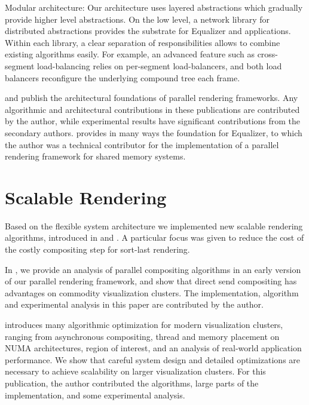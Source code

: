 \begin{compactdesc}
\item[Modular architecture:] Our architecture uses layered abstractions which
gradually provide higher level abstractions. On the low level, a network
library for distributed abstractions provides the substrate for Equalizer and
applications. Within each library, a clear separation of responsibilities
allows to combine existing algorithms easily. For example, an advanced feature
such as cross-segment load-balancing relies on per-segment load-balancers, and
both load balancers reconfigure the underlying compound tree each frame.

\end{compactdesc}

\cite{EMP:09} and \cite{ESP:18} publish the architectural foundations of
parallel rendering frameworks. Any algorithmic and architectural contributions
in these publications are contributed by the author, while experimental results
have significant contributions from the secondary authors. \cite{BRE:05}
provides in many ways the foundation for Equalizer, to which the author was a
technical contributor for the implementation of a parallel rendering framework
for shared memory systems.

\section{Scalable Rendering}

Based on the flexible system architecture we implemented new scalable rendering
algorithms, introduced in \cite{EMP:09} and \cite{ESP:18}. A particular focus
was given to reduce the cost of the costly compositing step for sort-last
rendering.

In \cite{EP:07}, we provide an analysis of parallel compositing algorithms in an
early version of our parallel rendering framework, and show that direct send
compositing has advantages on commodity visualization clusters. The
implementation, algorithm and experimental analysis in this paper are
contributed by the author.

\cite{EBAHMP:12} introduces many algorithmic optimization for modern
visualization clusters, ranging from asynchronous compositing, thread and memory
placement on NUMA architectures, region of interest, and an analysis of
real-world application performance. We show that careful system design and
detailed optimizations are necessary to achieve scalability on larger
visualization clusters. For this publication, the author contributed the
algorithms, large parts of the implementation, and some experimental analysis.

